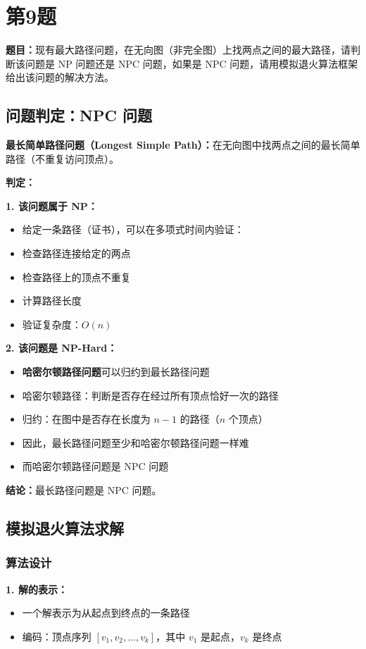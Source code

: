 \documentclass[UTF8,12pt,a4paper]{ctexart}
\begin{document}
\section*{第9题}
\textbf{题目：}现有最大路径问题，在无向图（非完全图）上找两点之间的最大路径，请判断该问题是 NP 问题还是 NPC 问题，如果是 NPC 问题，请用模拟退火算法框架给出该问题的解决方法。

\subsection*{问题判定：NPC 问题}

\textbf{最长简单路径问题（Longest Simple Path）：}在无向图中找两点之间的最长简单路径（不重复访问顶点）。

\textbf{判定：}

\textbf{1. 该问题属于 NP：}
\begin{itemize}
	\item 给定一条路径（证书），可以在多项式时间内验证：
	\item 检查路径连接给定的两点
	\item 检查路径上的顶点不重复
	\item 计算路径长度
	\item 验证复杂度：$O(n)$
\end{itemize}

\textbf{2. 该问题是 NP-Hard：}
\begin{itemize}
	\item \textbf{哈密尔顿路径问题}可以归约到最长路径问题
	\item 哈密尔顿路径：判断是否存在经过所有顶点恰好一次的路径
	\item 归约：在图中是否存在长度为 $n-1$ 的路径（$n$ 个顶点）
	\item 因此，最长路径问题至少和哈密尔顿路径问题一样难
	\item 而哈密尔顿路径问题是 NPC 问题
\end{itemize}

\textbf{结论：}最长路径问题是 NPC 问题。

\subsection*{模拟退火算法求解}

\subsubsection*{算法设计}

\textbf{1. 解的表示：}
\begin{itemize}
	\item 一个解表示为从起点到终点的一条路径
	\item 编码：顶点序列 $[v_1, v_2, \ldots, v_k]$，其中 $v_1$ 是起点，$v_k$ 是终点
\end{itemize}
\end{document}
